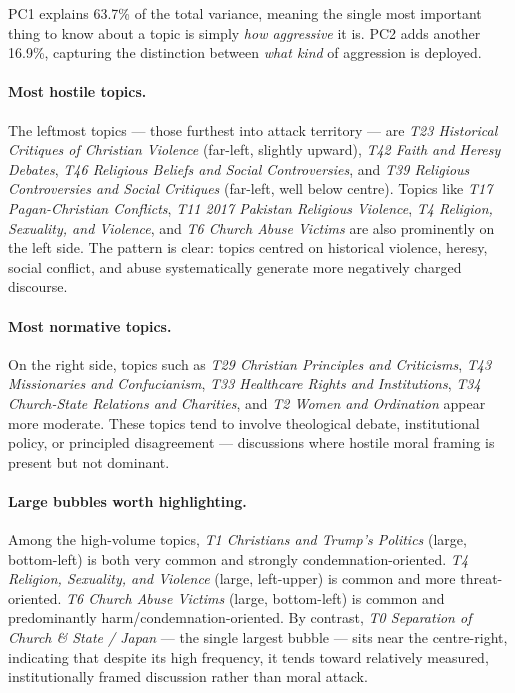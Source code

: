 \documentclass[../CLthesis.tex]{subfiles}
\begin{document}
PC1 explains 63.7\% of the total variance, meaning the single most important thing to know about a topic is simply \emph{how aggressive} it is. PC2 adds another 16.9\%, capturing the distinction between \emph{what kind} of aggression is deployed.

\paragraph{Most hostile topics.}
The leftmost topics — those furthest into attack territory — are \textit{T23 Historical Critiques of Christian Violence} (far-left, slightly upward), \textit{T42 Faith and Heresy Debates}, \textit{T46 Religious Beliefs and Social Controversies}, and \textit{T39 Religious Controversies and Social Critiques} (far-left, well below centre). Topics like \textit{T17 Pagan-Christian Conflicts}, \textit{T11 2017 Pakistan Religious Violence}, \textit{T4 Religion, Sexuality, and Violence}, and \textit{T6 Church Abuse Victims} are also prominently on the left side. The pattern is clear: topics centred on historical violence, heresy, social conflict, and abuse systematically generate more negatively charged discourse.

\paragraph{Most normative topics.}
On the right side, topics such as \textit{T29 Christian Principles and Criticisms}, \textit{T43 Missionaries and Confucianism}, \textit{T33 Healthcare Rights and Institutions}, \textit{T34 Church-State Relations and Charities}, and \textit{T2 Women and Ordination} appear more moderate. These topics tend to involve theological debate, institutional policy, or principled disagreement — discussions where hostile moral framing is present but not dominant.

\paragraph{Large bubbles worth highlighting.}
Among the high-volume topics, \textit{T1 Christians and Trump's Politics} (large, bottom-left) is both very common and strongly condemnation-oriented. \textit{T4 Religion, Sexuality, and Violence} (large, left-upper) is common and more threat-oriented. \textit{T6 Church Abuse Victims} (large, bottom-left) is common and predominantly harm/condemnation-oriented. By contrast, \textit{T0 Separation of Church \& State / Japan} — the single largest bubble — sits near the centre-right, indicating that despite its high frequency, it tends toward relatively measured, institutionally framed discussion rather than moral attack.
\end{document}
